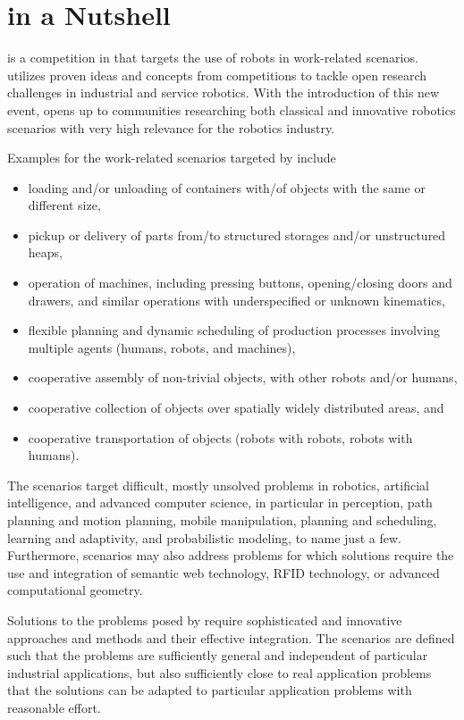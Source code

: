 \section{\RCAW in a Nutshell}\label{sec:at_work_nushell}
\RCAW is a competition in \RC that targets the use of robots in work-related scenarios. \RCAW utilizes proven ideas and concepts from \RC competitions to tackle open research challenges in industrial and service robotics. With the introduction of this new event, \RC opens up to communities researching both classical and innovative robotics scenarios with very high relevance for the robotics industry. 
\par
Examples for the work-related scenarios targeted by \RCAW include

\begin{itemize}
	\item loading and/or unloading of containers with/of objects with the same 	or different size,
	\item pickup or delivery of parts from/to structured storages and/or 				unstructured heaps,
	\item operation of machines, including pressing buttons, opening/closing 			doors and drawers, and similar operations with underspecified or unknown 			kinematics,
	\item flexible planning and dynamic scheduling of production processes 			involving multiple agents (humans, robots, and machines),
	\item cooperative assembly of non-trivial objects, with other robots 				and/or humans,
	\item cooperative collection of objects over spatially widely  distributed 	areas, and
	\item cooperative transportation of objects (robots with robots, robots 			with humans).
\end{itemize}

The \RCAW scenarios target difficult, mostly unsolved problems in robotics, artificial intelligence, and advanced computer science, in particular in perception, path planning and motion planning, mobile manipulation, planning and scheduling, learning and adaptivity, and probabilistic modeling, to name just a few. Furthermore, \RCAW scenarios may also address problems for which solutions require the use and integration of semantic web technology, RFID technology, or advanced computational geometry.
\par

Solutions to the problems posed by \RCAW require sophisticated and innovative approaches and methods and their effective integration. The scenarios are defined such that the problems are sufficiently general and independent of particular industrial applications, but also sufficiently close to real application problems that the solutions can be adapted to particular application problems with reasonable effort.
\par

